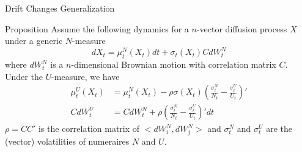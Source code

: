 \documentclass{beamer}
\begin{document}

\begin{frame}{Drift Changes Generalization}
	\begin{block}{Proposition}
		Assume the following dynamics for a $n$-vector diffusion process $X$ under a generic $N$-measure
		\begin{equation*}
			dX_t = \mu_t^N(X_t)dt + \sigma_t(X_t)CdW^N_t
		\end{equation*}
		where $dW^N_t$ is a $n$-dimensional Brownian motion with correlation matrix $C$. Under the $U$-measure, we have
		\begin{align}
			\mu^U_t(X_t) &= \mu^N_t(X_t) - \rho\sigma(X_t)\left(\frac{\sigma^N_t}{N_t}-\frac{\sigma^U_t}{U_t}\right)' \\
			CdW^U_t &= CdW^N_t + \rho\left(\frac{\sigma^N_t}{N_t}-\frac{\sigma^U_t}{U_t}\right)' dt
		\end{align}
		$\rho=CC'$ is the correlation matrix of $<dW^N_i,dW^N_j>$ and $\sigma^N_t$ and $\sigma^U_t$ are the (vector) volatilities of numeraires $N$ and $U$. %
	\end{block}
\end{frame}
\end{document}
